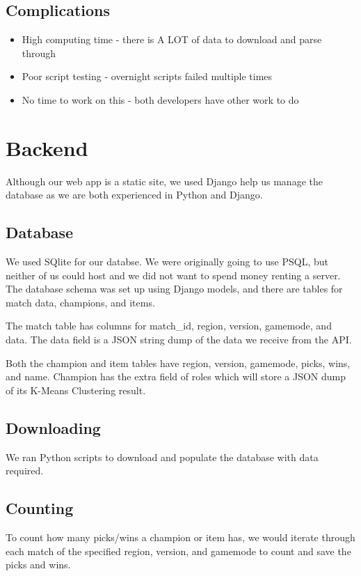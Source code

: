\documentclass{article}
\begin{document}
\subsection{Complications}
\begin{itemize}
    \item High computing time - there is A LOT of data to download and parse through
    \item Poor script testing - overnight scripts failed multiple times
    \item No time to work on this - both developers have other work to do
\end{itemize}


\section{Backend}
Although our web app is a static site, we used Django help us manage the database as we are both experienced in Python and Django.

\subsection{Database}
We used SQlite for our databse. We were originally going to use PSQL, but neither of us could host and we did not want to spend money renting a server. The database schema was set up using Django models, and there are tables for match data, champions, and items. 

The match table has columns for match\_id, region, version, gamemode, and data. The data field is a JSON string dump of the data we receive from the API. 

Both the champion and item tables have region, version, gamemode, picks, wins, and name. Champion has the extra field of roles which will store a JSON dump of its K-Means Clustering result.

\subsection{Downloading}
We ran Python scripts to download and populate the database with data required.

\subsection{Counting}
To count how many picks/wins a champion or item has, we would iterate through each match of the specified region, version, and gamemode to count and save the picks and wins.
\end{document}
